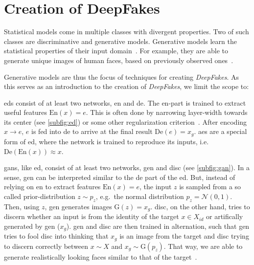 \section{Creation of DeepFakes}\label{sect:creation-of-deepfakes}
Statistical models come in multiple classes with divergent properties.
Two of such classes are discriminative and generative models. Generative models
learn the statistical properties of their input domain~\cite[cf.][\nopp{}651\psqq]{Goodfellow.2016}.
For example, they are able to generate unique images of human faces, based on
previously observed ones~\cite{Karras.2019}.

\par
Generative models are thus the focus of techniques for creating \textit{DeepFakes}. As
this serves as an introduction to the creation of \textit{DeepFakes}, we limit the scope
to:
\begin{description}[leftmargin=0cm]
    \item[\glspl{ed}] \glspl{ed} consist of at least two networks, \gls{en} and
    \gls{de}. The \gls{en}-part is trained to extract
    useful features \(\text{En}(x)=e\). This is often done by narrowing
    layer-width towards its center (see \cref{subfig:ed}) or some other
    regularization criterion~\cite[cf.][499-505]{Goodfellow.2016}. After encoding
    \(x \rightarrow e\), \(e\) is fed into \gls{de} to arrive at the final result
    \(\text{De}(e)=x_g\). \Glspl{ae} are a special form of \gls{ed}, where the
    network is trained to reproduce its inputs, i.e.\
    \(\text{De}(\text{En}(x))\approx x\).

    \item[\glspl{gan}] \glspl{gan}, like \gls{ed}, consist of at least two networks,
    \gls{gen} and \gls{disc} (see \cref{subfig:gan}). In a sense, \gls{gen} can
    be interpreted similar to the \gls{de} part of the \gls{ed}. But, instead of
    relying on \gls{en} to extract features \(\text{En}(x)=e\), the input
    \(z\) is sampled from a so called prior-distribution \(z\sim p_z\), e.g.\
    the normal distribution \(p_z=\mathcal{N}(0, 1)\). Then, using \(z\),
    \gls{gen} generates images \(\text{G}(z)=x_g\). \Gls{disc}, on the other hand,
    tries to discern whether an input is from the identity of the target
    \(x\in X_{id}\) or artifically generated by \gls{gen} (\(x_g\)). \Gls{gen}
    and \gls{disc} are then trained in alternation, such that \gls{gen} tries to
    fool \gls{disc} into thinking that \(x_g\) is an image from the target and
    \gls{disc} trying to discern correctly between \(x\sim X\) and \(x_g\sim \text{G}(p_z)\).
    That way, we are able to generate realistically looking faces similar to that
    of the target~\cite{Goodfellow.2014}.
\end{description}
